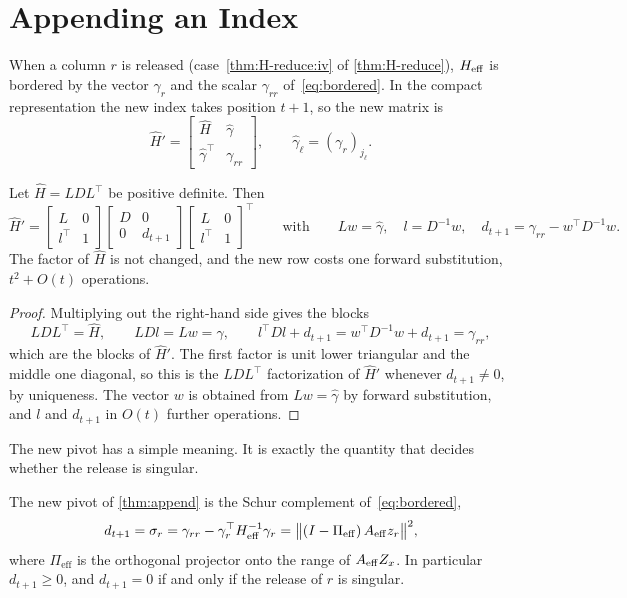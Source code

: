 \section{Appending an Index}
\label{sec:dense-append}

When a column $r$ is released (case~\ref{thm:H-reduce:iv} of \cref{thm:H-reduce}), $H_{\mathrm{eff}}$ is bordered by the
vector $\gamma_r$ and the scalar $\gamma_{rr}$ of~\eqref{eq:bordered}. In the compact
representation the new index takes position $t+1$, so the new matrix is
\[
\hat H' = \begin{bmatrix}\hat H & \hat\gamma\\ \hat\gamma^\top & \gamma_{rr}\end{bmatrix},
\qquad \hat\gamma_\ell = (\gamma_r)_{j_\ell}.
\]

\begin{theorem}[Append] \label{thm:append}
Let $\hat H = LDL^\top$ be positive definite. Then
\[
\hat H' = \begin{bmatrix} L & 0\\ l^\top & 1\end{bmatrix}
\begin{bmatrix} D & 0\\ 0 & d_{t+1}\end{bmatrix}
\begin{bmatrix} L & 0\\ l^\top & 1\end{bmatrix}^\top
\qquad\text{with}\qquad
Lw = \hat\gamma,\quad l = D^{-1}w,\quad d_{t+1} = \gamma_{rr} - w^\top D^{-1}w .
\]
The factor of $\hat H$ is not changed, and the new row costs one forward substitution,
$t^2 + O(t)$ operations.
\end{theorem}

\begin{proof}
Multiplying out the right-hand side gives the blocks
\[
LDL^\top = \hat H,\qquad LDl = Lw = \hat\gamma,\qquad
l^\top Dl + d_{t+1} = w^\top D^{-1}w + d_{t+1} = \gamma_{rr},
\]
which are the blocks of $\hat H'$. The first factor is unit lower triangular and the middle one
diagonal, so this is the $LDL^\top$ factorization of $\hat H'$ whenever $d_{t+1}\ne0$, by
uniqueness. The vector $w$ is obtained from $Lw = \hat\gamma$ by forward substitution, and $l$
and $d_{t+1}$ in $O(t)$ further operations.
\end{proof}

The new pivot has a simple meaning. It is exactly the quantity that decides whether the
release is singular.

\begin{cor} \label{cor:append-pivot}
The new pivot of \cref{thm:append} is the Schur complement of~\eqref{eq:bordered},
\[
d_{t+1} = \sigma_r = \gamma_{rr} - \gamma_r^\top H_{\mathrm{eff}}^{-1}\gamma_r
= \bigl\lVert (I - \Pi_{\mathrm{eff}})\,A_{\mathrm{eff}} z_r\bigr\rVert^2 ,
\]
where $\Pi_{\mathrm{eff}}$ is the orthogonal projector onto the range of $A_{\mathrm{eff}} Z_x$. In particular
$d_{t+1}\ge0$, and $d_{t+1} = 0$ if and only if the release of $r$ is singular.
\end{cor}

